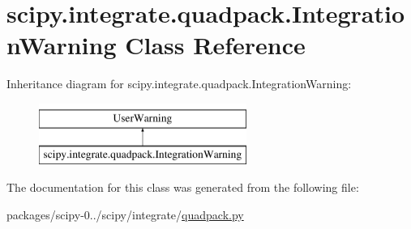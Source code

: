 \hypertarget{classscipy_1_1integrate_1_1quadpack_1_1IntegrationWarning}{}\section{scipy.\+integrate.\+quadpack.\+Integration\+Warning Class Reference}
\label{classscipy_1_1integrate_1_1quadpack_1_1IntegrationWarning}
Inheritance diagram for scipy.\+integrate.\+quadpack.\+Integration\+Warning\+:\begin{figure}[H]
\begin{center}
\leavevmode
\includegraphics[height=2.000000cm]{classscipy_1_1integrate_1_1quadpack_1_1IntegrationWarning}
\end{center}
\end{figure}


The documentation for this class was generated from the following file\+:\begin{DoxyCompactItemize}
\item 
packages/scipy-\/0../scipy/integrate/\hyperlink{quadpack_8py}{quadpack.\+py}\end{DoxyCompactItemize}
